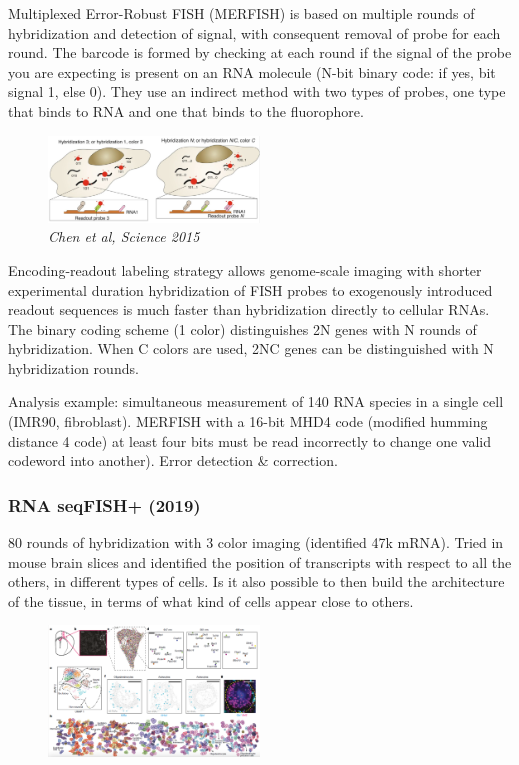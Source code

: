 Multiplexed Error-Robust FISH (MERFISH) is based on multiple rounds of
hybridization and detection of signal, with consequent removal of probe
for each round. The barcode is formed by checking at each round if the
signal of the probe you are expecting is present on an RNA molecule
(N-bit binary code: if yes, bit signal 1, else 0). They use an indirect
method with two types of probes, one type that binds to RNA and one that
binds to the fluorophore.

\begin{figure}
\centering
\includegraphics[width=0.5\textwidth]{images/Screenshot_6.png}
\caption{\emph{Chen et al, Science 2015}}
\end{figure}

Encoding-readout labeling strategy allows genome-scale imaging with
shorter experimental duration hybridization of FISH probes to
exogenously introduced readout sequences is much faster than
hybridization directly to cellular RNAs. The binary coding scheme (1
color) distinguishes 2N genes with N rounds of hybridization. When C
colors are used, 2NC genes can be distinguished with N hybridization
rounds.

Analysis example: simultaneous measurement of 140 RNA species in a
single cell (IMR90, fibroblast). MERFISH with a 16-bit MHD4 code
(modified humming distance 4 code) at least four bits must be read
incorrectly to change one valid codeword into another). Error detection
\& correction.

\hypertarget{rna-seqfish-2019}{%
\subsubsection{\texorpdfstring{\textbf{RNA seqFISH+
(2019)}}{RNA seqFISH+ (2019)}}\label{rna-seqfish-2019}}

80 rounds of hybridization with 3 color imaging (identified 47k mRNA).
Tried in mouse brain slices and identified the position of transcripts
with respect to all the others, in different types of cells. Is it also
possible to then build the architecture of the tissue, in terms of what
kind of cells appear close to others.

\begin{figure}
\centering
\includegraphics[width=0.5\textwidth]{images/Screenshot_7.png}
\caption{}
\end{figure}

